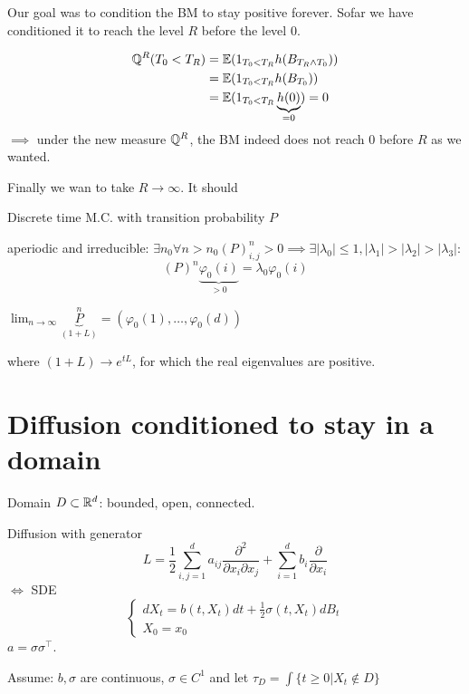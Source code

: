 Our goal was to condition the BM to stay positive forever. Sofar we have conditioned it to reach the level $R$
before the level $0$.

\begin{remark}
    \begin{align*}
        \mathbb{Q}^R(T_0<T_R)&=\mathbb{E}(1_{T_0<T_R}h(B_{T_R\land T_0}))\\
        &=\mathbb{E}(1_{T_0<T_R}h(B_{T_0}))\\
        &=\mathbb{E}(1_{T_0<T_R}\underbrace{h(0)}_{=0})=0
    \end{align*}
    $\implies$ under the new measure $\mathbb{Q}^R$, the BM indeed does not reach $0$ before $R$ as we wanted.
\end{remark}

Finally we wan to take $R\to\infty$. It should


\begin{aexample}
    Discrete time M.C. with transition probability $P$

    aperiodic and irreducible: $\exists n_0\forall n>n_0 (P)_{i,j}^n>0\implies \exists |\lambda_0|\leq 1,|\lambda_1|>|\lambda_2|>|\lambda_3|$:\[(P)^n\underbrace{\varphi_0(i)}_{>0}=\lambda_0\varphi_0(i)\]

    $\lim_{n\to\infty} \underbrace{P}_{(1+L)}^n = (\varphi_0(1),\dots,\varphi_0(d))$

    where $(1+L)\to e^{tL}$, for which the real eigenvalues are positive.

\end{aexample}


\section{Diffusion conditioned to stay in a domain} %

Domain $D\subset\mathbb{R}^d$: bounded, open, connected.

Diffusion with generator 
\[L=\frac{1}{2}\sum_{i,j=1}^d a_{ij}\frac{\partial^2}{\partial x_i\partial x_j}+\sum_{i=1}^d b_i \frac{\partial}{\partial x_i}\] 
$\iff$ SDE 
\[\begin{cases}
    dX_t=b(t,X_t)dt+\frac{1}{2}\sigma(t,X_t)dB_t\\
    X_0=x_0
\end{cases}\]
$a=\sigma\sigma^\intercal$.

Assume: $b,\sigma$ are continuous, $\sigma\in C^1$ and let $\tau_D=\int\{t\geq 0|X_t\notin D\}$


